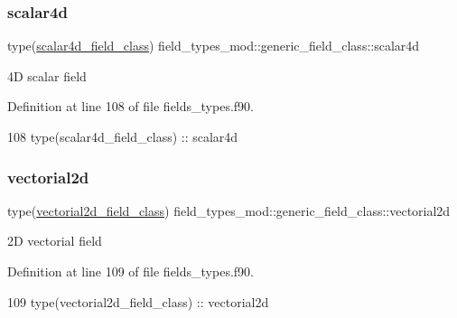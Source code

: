 \subsubsection{\texorpdfstring{scalar4d}{scalar4d}}
{\footnotesize\ttfamily type(\mbox{\hyperlink{structfield__types__mod_1_1scalar4d__field__class}{scalar4d\+\_\+field\+\_\+class}}) field\+\_\+types\+\_\+mod\+::generic\+\_\+field\+\_\+class\+::scalar4d\hspace{0.3cm}{\ttfamily [private]}}



4D scalar field 



Definition at line 108 of file fields\+\_\+types.\+f90.


\begin{DoxyCode}
108         \textcolor{keywordtype}{type}(scalar4d\_field\_class) :: scalar4d
\end{DoxyCode}
\mbox{\label{structfield__types__mod_1_1generic__field__class_acb71604f43668ee0bf8990008f9db323}} 
\subsubsection{\texorpdfstring{vectorial2d}{vectorial2d}}
{\footnotesize\ttfamily type(\mbox{\hyperlink{structfield__types__mod_1_1vectorial2d__field__class}{vectorial2d\+\_\+field\+\_\+class}}) field\+\_\+types\+\_\+mod\+::generic\+\_\+field\+\_\+class\+::vectorial2d\hspace{0.3cm}{\ttfamily [private]}}



2D vectorial field 



Definition at line 109 of file fields\+\_\+types.\+f90.


\begin{DoxyCode}
109         \textcolor{keywordtype}{type}(vectorial2d\_field\_class) :: vectorial2d
\end{DoxyCode}
\mbox{\label{structfield__types__mod_1_1generic__field__class_ab83038aec40a2449f0113a8d7b8fa388}} 
